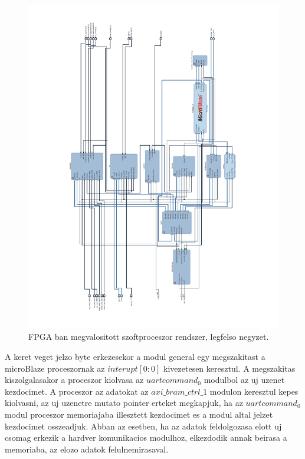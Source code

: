 \renewcommand{\img}{SajatRobot/FPGAmodulok/UartUML.jpg}
\renewcommand{\sources}{*}
\renewcommand{\captionn}{FPGA hardver/MicroBlaze proceszor es ROS node kozti komunikacio megvalistiasa UART protokol alapjan }
\renewcommand{\figlabel}{FPGAuartRos}


\begin{figure}[H]
  \includegraphics[width=1.2\columnwidth]{tikz/VivadoHL.pdf}
  \caption{FPGA ban megvalositott szoftproceszor rendszer, legfelso negyzet.}
  \label{fig:VivadoHl}
\end{figure}

A keret veget jelzo byte erkezesekor a modul general egy megszakitast a microBlaze proceszornak az $interupt[0:0]$ kivezetesen keresztul.
A megszakitas kiszolgalasakor a proceszor kiolvasa az $uartcommand_0$ modulbol az uj uzenet kezdocimet. A proceszor az adatokat az $axi\_bram\_ctrl\_1$ modulon keresztul kepes kiolvasni, az uj uzenetre mutato pointer erteket megkapjuk, ha az $uartcommand_0$ modul proceszor memoriajaba illesztett kezdocimet es a modul altal jelzet kezdocimet osszeadjuk.
Abban az esetben, ha az adatok feldolgozasa elott uj csomag erkezik a hardver komunikacios modulhoz, elkezdodik annak beirasa a memoriaba, az elozo adatok felulnemirasaval.

